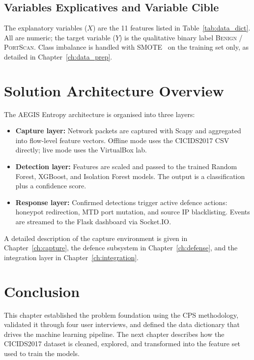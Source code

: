 \subsection{Variables Explicatives and Variable Cible}

The explanatory variables ($X$) are the 11 features listed in Table~\ref{tab:data_dict}. All are numeric; the target variable ($Y$) is the qualitative binary label \textsc{Benign} / \textsc{PortScan}. Class imbalance is handled with SMOTE~\cite{chawla2002} on the training set only, as detailed in Chapter~\ref{ch:data_prep}.

\section{Solution Architecture Overview}

The AEGIS Entropy architecture is organised into three layers:

\begin{itemize}
    \item \textbf{Capture layer:} Network packets are captured with Scapy and aggregated into flow-level feature vectors. Offline mode uses the CICIDS2017 CSV directly; live mode uses the VirtualBox lab.
    \item \textbf{Detection layer:} Features are scaled and passed to the trained Random Forest, XGBoost, and Isolation Forest models. The output is a classification plus a confidence score.
    \item \textbf{Response layer:} Confirmed detections trigger active defence actions: honeypot redirection, MTD port mutation, and source IP blacklisting. Events are streamed to the Flask dashboard via Socket.IO.
\end{itemize}

A detailed description of the capture environment is given in Chapter~\ref{ch:capture}, the defence subsystem in Chapter~\ref{ch:defense}, and the integration layer in Chapter~\ref{ch:integration}.

\section{Conclusion}

This chapter established the problem foundation using the CPS methodology, validated it through four user interviews, and defined the data dictionary that drives the machine learning pipeline. The next chapter describes how the CICIDS2017 dataset is cleaned, explored, and transformed into the feature set used to train the models.
